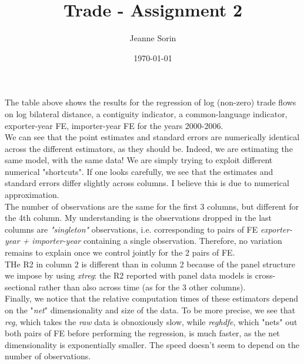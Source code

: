 \documentclass[10pt, final]{article}
\title{Trade - Assignment 2}
\author{Jeanne Sorin}
\date{\today}
\begin{document}
\maketitle


The table above shows the results for the regression of log (non-zero) trade flows on log bilateral distance, a contiguity indicator, a common-language indicator, exporter-year FE, importer-year FE for the years 2000-2006. \\
We can see that the point estimates and standard errors are numerically identical across the different estimators, as they should be. Indeed, we are estimating the same model, with the same data! We are simply trying to exploit different numerical "shortcuts". If one looks carefully, we see that the estimates and standard errors differ slightly across columns. I believe this is due to numerical approximation.
\\
The number of observations are the same for the first 3 columns, but different for the 4th column. My understanding is the observations dropped in the last columns are \textit{"singleton"} observations, i.e. corresponding to pairs of FE \textit{exporter-year + importer-year} containing a single observation. Therefore, no variation remains to explain once we control jointly for the 2 pairs of FE.
\\
THe R2 in column 2 is different than in column 2 because of the panel structure we impose by using \textit{xtreg}: the R2 reported with panel data models is cross-sectional rather than also across time (as for the 3 other columns).
\\
Finally, we notice that the relative computation times of these estimators depend on the "\textit{net}" dimensionality and size of the data. To be more precise, we see that \textit{reg}, which takes the \textit{raw} data is obnoxiously slow, while \textit{reghdfe}, which "nets" out both pairs of FE before performing the regression, is much faster, as the net dimensionality is exponentially smaller. The speed doesn't seem to depend on the number of observations.
\end{document}
